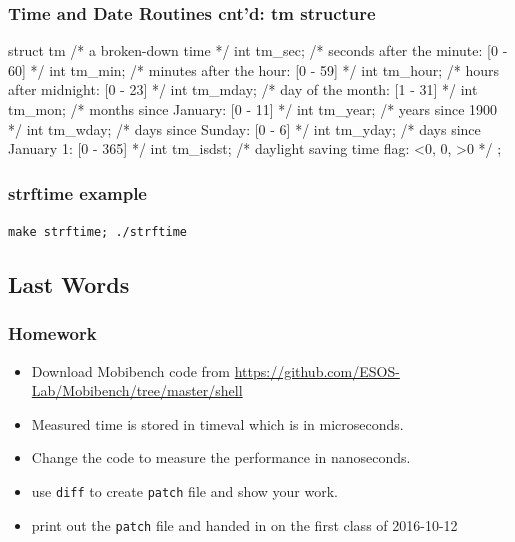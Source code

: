 \documentclass[newPxFont,sthlmFooter,nooffset]{beamer}
\begin{document}
\begin{frame}[containsverbatim,t]
  \frametitle{Time and Date Routines cnt'd: tm structure}

\begin{codedef}
struct tm {         /* a broken-down time */
     int  tm_sec;   /* seconds after the minute: [0 - 60] */
     int  tm_min;   /* minutes after the hour: [0 - 59] */
     int  tm_hour;  /* hours after midnight: [0 - 23] */
     int  tm_mday;  /* day of the month: [1 - 31] */
     int  tm_mon;   /* months since January: [0 - 11] */
     int  tm_year;  /* years since 1900 */
     int  tm_wday;  /* days since Sunday: [0 - 6] */
     int  tm_yday;  /* days since January 1: [0 - 365] */
     int  tm_isdst; /* daylight saving time flag: <0, 0, >0 */
};
\end{codedef}


\end{frame}

\begin{frame}[containsverbatim,t]
  \frametitle{strftime example}
\texttt{make strftime; ./strftime}



\end{frame}





\subsection{Last Words}
\begin{frame}[t]
  \frametitle{Homework}

  \begin{itemize}
  \item Download Mobibench code from \href{https://github.com/ESOS-Lab/Mobibench/tree/master/shell}{https://github.com/ESOS-Lab/Mobibench/tree/master/shell}
  \item Measured time is stored in timeval which is in microseconds. 
  \item Change the code to measure the performance in nanoseconds.
  \item use \texttt{diff} to create \texttt{patch} file and show your work.
  \item print out the \texttt{patch} file and handed in on the first class of 2016-10-12
  \end{itemize}
\end{frame}
\end{document}
